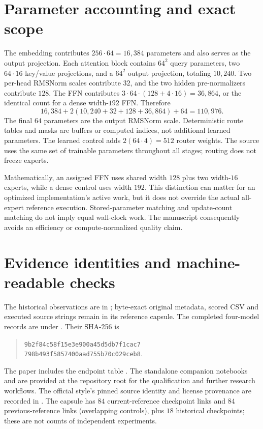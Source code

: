 \documentclass{article}
\begin{document}



\appendix
\section{Parameter accounting and exact scope}
The embedding contributes $256\cdot64=16{,}384$ parameters and also serves as the output projection. Each attention block contains $64^2$ query parameters, two $64\cdot16$ key/value projections, and a $64^2$ output projection, totaling $10{,}240$. Two per-head RMSNorm scales contribute $32$, and the two hidden pre-normalizers contribute $128$. The FFN contributes $3\cdot64\cdot(128+4\cdot16)=36{,}864$, or the identical count for a dense width-$192$ FFN. Therefore
\begin{equation}
 16{,}384+2(10{,}240+32+128+36{,}864)+64=110{,}976.
\end{equation}
The final $64$ parameters are the output RMSNorm scale. Deterministic route tables and masks are buffers or computed indices, not additional learned parameters. The learned control adds $2(64\cdot4)=512$ router weights. The source uses the same set of trainable parameters throughout all stages; routing does not freeze experts.

Mathematically, an assigned FFN uses shared width $128$ plus two width-$16$ experts, while a dense control uses width $192$. This distinction can matter for an optimized implementation's active work, but it does not override the actual all-expert reference execution. Stored-parameter matching and update-count matching do not imply equal wall-clock work. The manuscript consequently avoids an efficiency or compute-normalized quality claim.

\section{Evidence identities and machine-readable checks}
The historical observations are in ; byte-exact original metadata, scored CSV and executed source strings remain in its reference capsule. The completed four-model records are under . Their  SHA-256 is
\begin{quote}
\small\texttt{9b2f84c58f15e3e900a45d5db7f1cac7}\\
\texttt{798b493f5857400aad755b70c029ceb8}.
\end{quote}
The paper includes the endpoint table . The standalone companion notebooks  and  are provided at the repository root for the qualification and further research workflows. The official style's pinned source identity and license provenance are recorded in . The capsule has $84$ current-reference checkpoint links and $84$ previous-reference links (overlapping controls), plus $18$ historical checkpoints; these are not counts of independent experiments.
\end{document}
